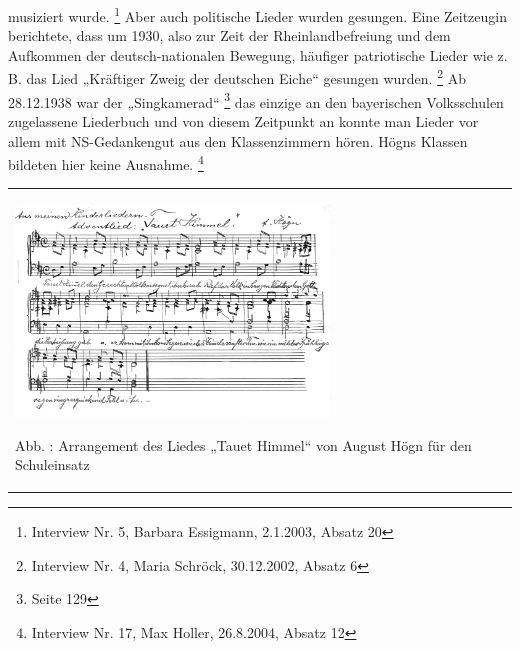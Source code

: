\documentclass[a4paper]{article}
\newcounter{Abb}
\renewcommand\theAbb{\arabic{Abb}}
\begin{document}
musiziert wurde. \footnote{Interview Nr. 5, Barbara Essigmann,
2.1.2003, Absatz 20} Aber auch politische Lieder wurden gesungen. Eine
Zeitzeugin berichtete, dass um 1930, also zur Zeit der
Rheinlandbefreiung und dem Aufkommen der deutsch-nationalen Bewegung,
häufiger patriotische Lieder wie z. B. das Lied „Kräftiger Zweig der
deutschen Eiche“ gesungen wurden. \footnote{Interview Nr. 4, Maria
Schröck, 30.12.2002, Absatz 6} Ab 28.12.1938 war der „Singkamerad“
 \footnote{Seite 129} das einzige an den bayerischen Volksschulen
zugelassene Liederbuch und von diesem Zeitpunkt an konnte man Lieder
vor allem mit NS-Gedankengut aus den Klassenzimmern hören. Högns
Klassen bildeten hier keine Ausnahme. \footnote{Interview Nr. 17, Max
Holler, 26.8.2004, Absatz 12}

\begin{center}
\begin{minipage}{8.807cm}
\begin{flushleft}
\tablefirsthead{}
\tablehead{}
\tabletail{}
\tablelasttail{}
\begin{supertabular}{m{8.607cm}}

\includegraphics[width=8.373cm,height=5.604cm]{pictures/zulassungsarbeit-img033.png}

Abb. \stepcounter{Abb}{\theAbb}: Arrangement des Liedes „Tauet Himmel“
von August Högn für den Schuleinsatz\\
\end{supertabular}
\end{flushleft}
\end{minipage}
\end{center}
\end{document}
